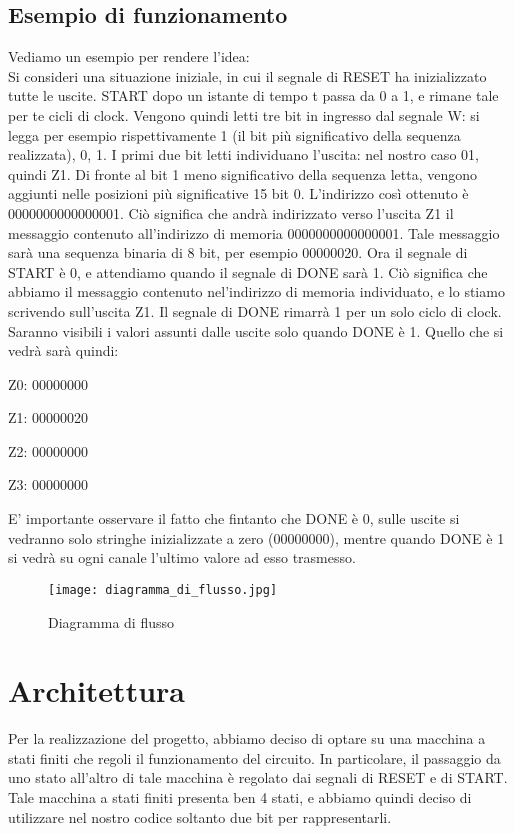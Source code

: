\documentclass{article}
\begin{document}
\subsection{Esempio di funzionamento}
Vediamo un esempio per rendere l'idea:\\
Si consideri una situazione iniziale, in cui il segnale di RESET ha inizializzato tutte le uscite. START dopo un istante di tempo t passa da 0 a 1, e rimane tale per te cicli di clock. Vengono quindi letti tre bit in ingresso dal segnale W: si legga per esempio rispettivamente 1 (il bit più significativo della sequenza realizzata), 0, 1. I primi due bit letti individuano l'uscita: nel nostro caso 01, quindi Z1. Di fronte al bit 1 meno significativo della sequenza letta, vengono aggiunti nelle posizioni più significative 15 bit 0. L'indirizzo così ottenuto è 0000000000000001. Ciò significa che andrà indirizzato verso l'uscita Z1 il messaggio contenuto all'indirizzo di memoria 0000000000000001. Tale messaggio sarà una sequenza binaria di 8 bit, per esempio 00000020. Ora il segnale di START è 0, e attendiamo quando il segnale di DONE sarà 1. Ciò significa che abbiamo il messaggio contenuto nel'indirizzo di memoria individuato, e lo stiamo scrivendo sull'uscita Z1. Il segnale di DONE rimarrà 1 per un solo ciclo di clock. Saranno visibili i valori assunti dalle uscite solo quando DONE è 1. Quello che si vedrà sarà quindi:

Z0: 00000000

Z1: 00000020

Z2: 00000000

Z3: 00000000

\noindent E' importante osservare il fatto che fintanto che DONE è 0, sulle uscite si vedranno solo stringhe inizializzate a zero (00000000), mentre quando DONE è 1 si vedrà su ogni canale l'ultimo valore ad esso trasmesso.

\begin{figure}[H]
\centerline{\texttt{[image: diagramma\_di\_flusso.jpg]}}
\caption{Diagramma di flusso}
\label{fig}
\end{figure}

\section{Architettura}
Per la realizzazione del progetto, abbiamo deciso di optare su una macchina a stati finiti che regoli il funzionamento del circuito.
In particolare, il passaggio da uno stato all'altro di tale macchina è regolato dai segnali di RESET e di START.
Tale macchina a stati finiti presenta ben 4 stati, e abbiamo quindi deciso di utilizzare nel nostro codice soltanto due bit per rappresentarli.
\end{document}
